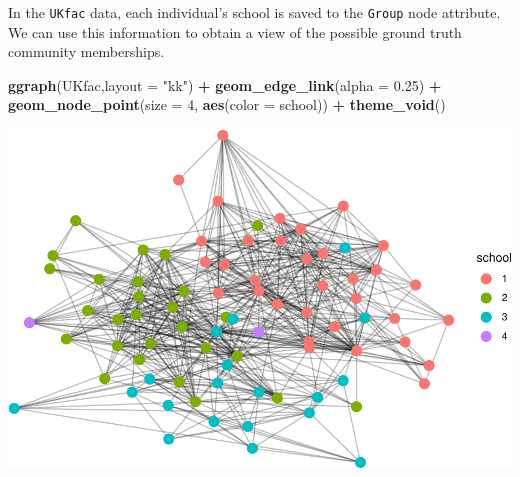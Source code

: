 \documentclass[]{article}
\newenvironment{Shaded}{\begin{snugshade}}{\end{snugshade}}
\newcommand{\DataTypeTok}[1]{\textcolor[rgb]{0.13,0.29,0.53}{#1}}
\newcommand{\DecValTok}[1]{\textcolor[rgb]{0.00,0.00,0.81}{#1}}
\newcommand{\FloatTok}[1]{\textcolor[rgb]{0.00,0.00,0.81}{#1}}
\newcommand{\KeywordTok}[1]{\textcolor[rgb]{0.13,0.29,0.53}{\textbf{#1}}}
\newcommand{\NormalTok}[1]{#1}
\newcommand{\OperatorTok}[1]{\textcolor[rgb]{0.81,0.36,0.00}{\textbf{#1}}}
\newcommand{\StringTok}[1]{\textcolor[rgb]{0.31,0.60,0.02}{#1}}
\begin{document}
In the \texttt{UKfac} data, each individual's school is saved to the
\texttt{Group} node attribute. We can use this information to obtain a
view of the possible ground truth community memberships.

\begin{Shaded}
\end{Shaded}

\begin{Shaded}
\begin{Highlighting}[]
\KeywordTok{ggraph}\NormalTok{(UKfac,}\DataTypeTok{layout =} \StringTok{"kk"}\NormalTok{) }\OperatorTok{+}
\StringTok{  }\KeywordTok{geom_edge_link}\NormalTok{(}\DataTypeTok{alpha =} \FloatTok{0.25}\NormalTok{) }\OperatorTok{+}\StringTok{ }
\StringTok{  }\KeywordTok{geom_node_point}\NormalTok{(}\DataTypeTok{size =} \DecValTok{4}\NormalTok{, }\KeywordTok{aes}\NormalTok{(}\DataTypeTok{color =}\NormalTok{ school)) }\OperatorTok{+}\StringTok{ }
\StringTok{  }\KeywordTok{theme_void}\NormalTok{()}
\end{Highlighting}
\end{Shaded}

\includegraphics{karate_test_files/figure-latex/unnamed-chunk-16-1.pdf}
\end{document}
